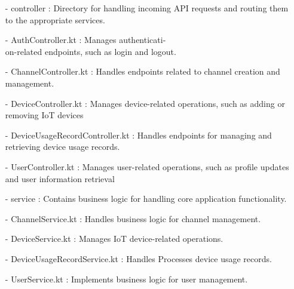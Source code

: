 \documentclass[conference]{IEEEtran}
\begin{document}
\begin{enumerate}
\begin{itemize}
\begin{itemize}
\begin{enumerate}
\begin{enumerate}
        \item[-] controller : Directory for handling incoming API requests and routing them to the appropriate services.\\
        \item[-] AuthController.kt : Manages authenticati-\\on-related endpoints, such as login and logout.\\
        \item[-] ChannelController.kt : Handles endpoints related to channel creation and management.\\
        \item[-] DeviceController.kt : Manages device-related operations, such as adding or removing IoT devices \\
        \item[-] DeviceUsageRecordController.kt : Handles endpoints for managing and retrieving device usage records.\\
        \item[-] UserController.kt : Manages user-related operations, such as profile updates and user information retrieval\\
        
        \item[-] service : Contains business logic for handling core application functionality.\\
        \item[-] ChannelService.kt : Handles business logic for channel management.
\\
        \item[-] DeviceService.kt : Manages IoT device-related operations.\\
        \item[-] DeviceUsageRecordService.kt : Handles Processes device usage records.\\
        \item[-] UserService.kt : Implements business logic for user management.\\
        

\end{enumerate}
\end{enumerate}
\end{itemize}
\end{itemize}
\end{enumerate}
\end{document}
